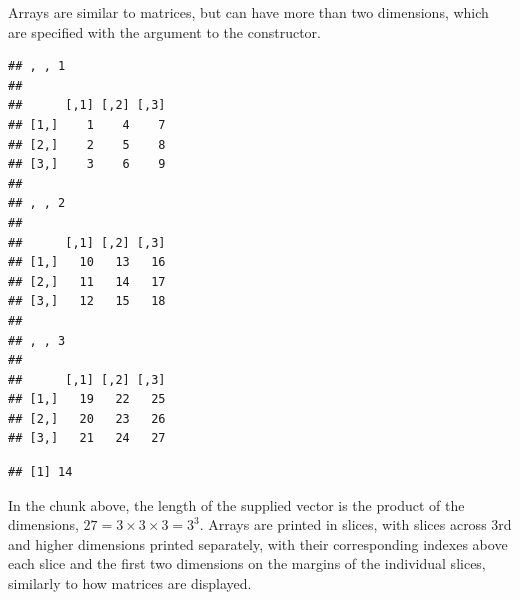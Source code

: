 \documentclass[krantz2]{krantz}\usepackage{knitr}
\begin{document}
Arrays are similar to matrices, but can have more than two dimensions, which are specified with the  argument to the  constructor.

\begin{knitrout}\footnotesize
{}\color{fgcolor}\begin{kframe}
\begin{alltt}
 \hlkwb{<-} \hlstd{(}\hlopt{:}\hlstd{,}  \hlstd{=} \hlstd{(}\hlstd{,} \hlstd{,} \hlstd{))}
\end{alltt}
\begin{verbatim}
## , , 1
## 
##      [,1] [,2] [,3]
## [1,]    1    4    7
## [2,]    2    5    8
## [3,]    3    6    9
## 
## , , 2
## 
##      [,1] [,2] [,3]
## [1,]   10   13   16
## [2,]   11   14   17
## [3,]   12   15   18
## 
## , , 3
## 
##      [,1] [,2] [,3]
## [1,]   19   22   25
## [2,]   20   23   26
## [3,]   21   24   27
\end{verbatim}
\begin{alltt}
\hlstd{B[}\hlstd{,} \hlstd{,} \hlstd{]}
\end{alltt}
\begin{verbatim}
## [1] 14
\end{verbatim}
\end{kframe}
\end{knitrout}

In the chunk above, the length of the supplied vector is the product of the dimensions, $27 = 3 \times 3 \times 3 = 3^3$. Arrays are printed in slices, with slices across 3rd and higher dimensions printed separately, with their corresponding indexes above each slice and the first two dimensions on the margins of the individual slices, similarly to how matrices are displayed.
\end{document}
